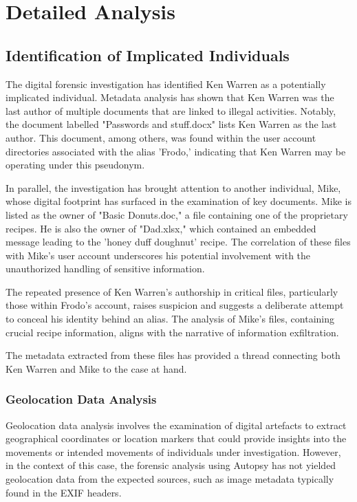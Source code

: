 \chapter{Detailed Analysis}

\section{Identification of Implicated Individuals}
The digital forensic investigation has identified Ken Warren as a potentially implicated individual. Metadata analysis has shown that Ken Warren was the last author of multiple documents that are linked to illegal activities. Notably, the document labelled "Passwords and stuff.docx" lists Ken Warren as the last author. This document, among others, was found within the user account directories associated with the alias 'Frodo,' indicating that Ken Warren may be operating under this pseudonym.

In parallel, the investigation has brought attention to another individual, Mike, whose digital footprint has surfaced in the examination of key documents. Mike is listed as the owner of "Basic Donuts.doc," a file containing one of the proprietary recipes. He is also the owner of "Dad.xlsx," which contained an embedded message leading to the 'honey duff doughnut' recipe. The correlation of these files with Mike's user account underscores his potential involvement with the unauthorized handling of sensitive information.

The repeated presence of Ken Warren's authorship in critical files, particularly those within Frodo's account, raises suspicion and suggests a deliberate attempt to conceal his identity behind an alias. The analysis of Mike's files, containing crucial recipe information, aligns with the narrative of information exfiltration.

The metadata extracted from these files has provided a thread connecting both Ken Warren and Mike to the case at hand.

\subsection{Geolocation Data Analysis}
Geolocation data analysis involves the examination of digital artefacts to extract geographical coordinates or location markers that could provide insights into the movements or intended movements of individuals under investigation. However, in the context of this case, the forensic analysis using Autopsy has not yielded geolocation data from the expected sources, such as image metadata typically found in the EXIF headers.

